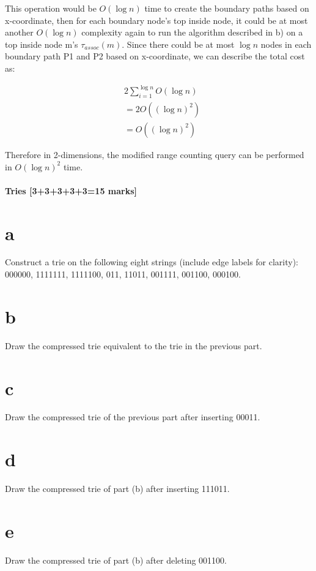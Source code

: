 \documentclass[12pt]{article}
\begin{document}
\begin{enumerate}
This operation would be $O(\log n)$ time to create the boundary paths based on x-coordinate, then for each boundary node's top inside node, it could be at most another $O(\log n)$ complexity again to run the algorithm described in b) on a top inside node m's $\tau_{assoc}(m)$. Since there could be at most $\log n$ nodes in each boundary path P1 and P2 based on x-coordinate, we can describe the total cost as:

\begin{align*}
  &2\sum_{i=1}^{\log n} O(\log n)\\
  &=2O((\log n)^2)\\
  &=O((\log n)^2)
\end{align*}

Therefore in 2-dimensions, the modified range counting query can be performed in $O(\log{n})^2$ time.
\end{enumerate}

\subsection{Tries [3+3+3+3+3=15 marks]}
\begin{itemize}
\part{a} Construct a trie on the following eight strings (include edge labels for clarity):\\ 000000, 1111111, 1111100, 011, 11011, 001111, 001100, 000100.


\part{b} Draw the compressed trie equivalent to the trie in the previous part.
\part{c} Draw the compressed trie of the previous part after inserting 00011.
\part{d} Draw the compressed trie of part (b) after inserting 111011.
\part{e} Draw the compressed trie of part (b) after deleting 001100.
\end{itemize}
\end{document}
